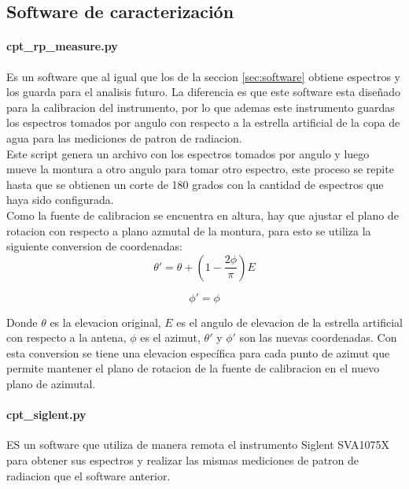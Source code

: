 \subsection{Software de caracterización}

\paragraph{cpt\_rp\_measure.py} Es un software que al igual que los de la seccion \ref{sec:software} obtiene espectros y los guarda para el analisis futuro. La diferencia es que este software esta diseñado para la calibracion del instrumento, por lo que ademas este instrumento guardas los espectros tomados por angulo con respecto a la estrella artificial de la copa de agua para las mediciones de patron de radiacion.\\

Este script genera un archivo con los espectros tomados por angulo y luego mueve la montura a otro angulo para tomar otro espectro, este proceso se repite hasta que se obtienen un corte de 180 grados con la cantidad de espectros que haya sido configurada.\\

Como la fuente de calibracion se encuentra en altura, hay que ajustar el plano de rotacion con respecto a plano azmutal de la montura, para esto se utiliza la siguiente conversion de coordenadas:\\

\begin{equation}
    \theta' = \theta + \left(1- \frac{2\phi}{\pi}\right)E
\end{equation}

\begin{equation}
    \phi' = \phi
\end{equation}

Donde $\theta$ es la elevacion original, $E$ es el angulo de elevacion de la estrella artificial con respecto a la antena, $\phi$ es el azimut, $\theta'$ y $\phi'$ son las nuevas coordenadas. Con esta conversion se tiene una elevacion específica para cada punto de azimut que permite mantener el plano de rotacion de la fuente de calibracion en el nuevo plano de azimutal.\\

\paragraph{cpt\_siglent.py} ES un software que utiliza de manera remota el instrumento Siglent SVA1075X para obtener sus espectros y realizar las mismas mediciones de patron de radiacion que el software anterior.\\